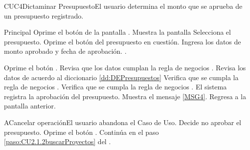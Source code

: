 	\begin{UseCase}{CUC4}{Dictaminar Presupuesto}{El usuario determina el monto que se aprueba de un presupuesto registrado.}
	\end{UseCase}

	\begin{UCtrayectoria}{Principal}
			\UCpaso[\UCactor] Oprime el botón   de la pantalla .
			\UCpaso Muestra la pantalla  
			\UCpaso[\UCactor] Selecciona el presupuesto.
      \UCpaso[\UCactor] Oprime el botón  del presupuesto en cuestión.
			\UCpaso[\UCactor] Ingresa los datos de monto aprobado y fecha de aprobación.  \label{paso:CUC4ingresarDatos}.

			\UCpaso [\UCactor] Oprime el botón  .
			\UCpaso Revisa que los datos cumplan la regla de negocios . 
			\UCpaso Revisa los datos de acuerdo al diccionario \ref{dd:DEPresupuestos} 
			\UCpaso Verifica que se cumpla la regla de negocios .  
      \UCpaso Verifica que se cumpla la regla de negocios .     
			\UCpaso El sistema registra la aprobación del presupuesto.
			\UCpaso Muestra el mensaje \ref{MSG4}.
			\UCpaso Regresa a la pantalla anterior.
	\end{UCtrayectoria}
	\newpage
	\begin{UCtrayectoriaA}{A}{Cancelar operación}{El usuario abandona el Caso de Uso.}
			\UCpaso[\UCactor] Decide no aprobar el presupuesto.
			\UCpaso[\UCactor] Oprime el botón .
			\UCpaso Continúa en el paso \ref{paso:CU2.1.2buscarProyectos} del .
	\end{UCtrayectoriaA}
		
